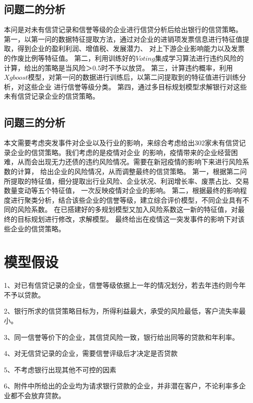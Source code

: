 \documentclass[UTF8]{ctexart}
\begin{document}
\subsection{问题二的分析}
本问是对未有信贷记录和信誉等级的企业进行信贷分析后给出银行的信贷策略。
第一，以第一问的数据特征提取方法，通过对企业的进销项发票信息进行特征值提取，得到企业的盈利利润、增值税、发展潜力、
对上下游企业影响能力以及发票的作废比例等特征值。
第二，利用训练好的$Voting$集成学习算法进行违约风险的计算，给出的策略是当风险＞0.5时不予以放贷。
第三，计算违约概率，利用$Xgboost$模型，对第一问的数据进行训练后，以第二问提取到的特征值进行训练分析，对这些企业
进行信誉等级分类。
第四，通过多目标规划模型求解银行对这些未有信贷记录企业的信贷策略。
\subsection{问题三的分析}
本文需要考虑突发事件对企业以及行业的影响，来综合考虑给出302家未有信贷记录企业的信贷策略。我们考虑的是疫情对企业
的影响，疫情带来的企业经营困难，从而会出现无力还债的违约风险情况。需要在新冠疫情的影响下来进行风险系数的计算，
给出企业的风险情况，从而调整最终的信贷策略。
第一，根据第二问所提取的特征值，细分提取出行业风险、企业状况、利润增长率、废票占比、交易数量变动等五个特征值，
一次反映疫情对企业的影响。
第二，根据最终的影响程度进行聚类分析，结合该些企业的信誉等级，建立综合评价模型，不同企业具有不同的风险系数。
在已搭建好的多规划模型又加入风险系数这一新的特征值，对最终的目标规划进行修改，求解模型。
最终给出在疫情这一突发事件的影响下对该些企业的信贷策略。

\section{模型假设}
1、对已有信贷记录的企业，信誉等级依据上一年的情况划分，若去年违约则今年不予以贷款。

2、银行所求的信贷策略目标为，所得利益最大，承受的风险最低，客户流失率最小。

3、同一信誉等价下的企业，其信贷风险一致，银行给出同等的贷款和年利率。

4、对无信贷记录的企业，需要信誉评级后才决定是否贷款

5、不考虑银行出现其他不可控的因素

6、附件中所给出的企业均为请求银行贷款的企业，并非潜在客户，不论利率多企业都不会放弃贷款。
\end{document}
